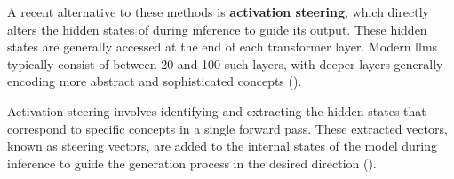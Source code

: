 A recent alternative to these methods is \textbf{activation steering}, which directly alters the hidden states of  during inference to guide its output. These hidden states are generally accessed at the end of each transformer layer. Modern \acp{llm} typically consist of between \num{20} and \num{100} such layers, with deeper layers generally encoding more abstract and sophisticated concepts (\cite{bogdanEmergentEffectsScaling2025}).

Activation steering involves identifying and extracting the hidden states that correspond to specific concepts in a single forward pass. These extracted vectors, known as steering vectors, are added to the internal states of the model during inference to guide the generation process in the desired direction (\cite{konenStyleVectorsSteering2024,turnerActivationAdditionSteering2024,subramaniExtractingLatentSteering2022}).
